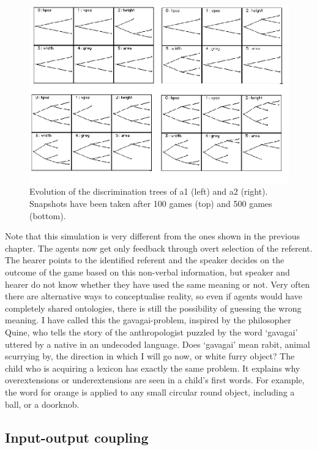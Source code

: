 \begin{figure}[htbp]
  \centerline{\includegraphics[width=\textwidth]{chap6/figs/gdis.pdf}}
\caption{\label{gdis1}Evolution of the discrimination
trees of {\bfshape  a1} (left) and {\bfshape  a2} (right).
Snapshots have been taken after 100 games (top) and 500 
games (bottom).} 
\end{figure}

Note that this simulation is very different from the 
ones shown in the previous chapter. The agents now get 
only feedback through overt selection of the referent. 
The hearer points to the identified referent and the speaker 
decides on the outcome of the game based on this 
non-verbal information, but speaker and hearer do not 
know whether they have used the same meaning or not. 
Very often there are alternative ways
to conceptualise reality, so even if agents would have
completely shared ontologies, there is still the possibility 
of guessing the wrong meaning. I have called this
the gavagai-problem, inspired by the philosopher
Quine, who tells the story of the anthropologist 
puzzled by the word `gavagai' uttered by a native 
in an undecoded language. Does `gavagai' mean rabit, animal 
scurrying by, the direction in which I will go 
now, or white furry object? 
The child who is acquiring a lexicon has
exactly the same problem. It explains why 
overextensions or underextensions
are seen in a child's first words. For example, 
the word for orange is applied to any small circular round 
object, including a ball, or a doorknob.

\subsection{Input-output coupling}

